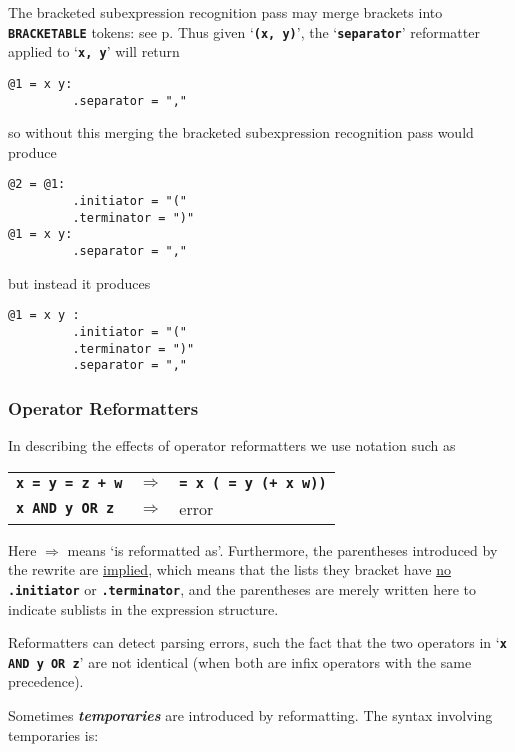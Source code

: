 \documentclass[12pt]{article}
\newcommand{\TT}[1]{{\tt \bfseries #1}}
\newcommand{\ikey}[2]{{\bf \em #1}\index{#2}}
\newcommand{\pagref}[1]{p\pageref{#1}}
\newenvironment{indpar}[1][0.3in]%
	{\begin{list}{}%
		     {\setlength{\itemsep}{0in}%
		      \setlength{\topsep}{0in}%
		      \setlength{\parsep}{1ex}%
		      \setlength{\labelwidth}{#1}%
		      \setlength{\leftmargin}{#1}%
		      \addtolength{\leftmargin}{\labelsep}}%
	 \item}%
	{\end{list}}
\begin{document}
The bracketed subexpression recognition pass may merge brackets
into \TT{BRACKETABLE} tokens: see \pagref{MERGING-BRACKETABLE-TOKENS}.
Thus given `\TT{(x, y)}', the `\TT{separator}' reformatter
applied to `\TT{x, y}' will return
\begin{indpar}\begin{verbatim}
@1 = x y:
         .separator = ","
\end{verbatim}\end{indpar}
so without this merging the bracketed subexpression recognition
pass would produce
\begin{indpar}\begin{verbatim}
@2 = @1:
         .initiator = "("
         .terminator = ")"
@1 = x y:
         .separator = ","
\end{verbatim}\end{indpar}
but instead it produces
\begin{indpar}\begin{verbatim}
@1 = x y :
         .initiator = "("
         .terminator = ")"
         .separator = ","
\end{verbatim}\end{indpar}

\subsubsection{Operator Reformatters}
\label{OPERATOR-REFORMATTERS}

In describing the effects of operator reformatters
we use notation such as

\hspace*{2em}\begin{tabular}{lcl}
\TT{x = y = z + w} & $\Longrightarrow$ & \TT{= x ( = y (+ x w))} \\
\TT{x AND y OR z} & $\Longrightarrow$ & error
\end{tabular}

Here $\Longrightarrow$ means `is reformatted as'.  Furthermore, the
parentheses introduced by the rewrite are \underline{implied},
which means that the lists they bracket have \underline{no}
\TT{.initiator} or \TT{.terminator}, and the parentheses are
merely written here to indicate sublists in the expression structure.

Reformatters can detect parsing errors, such the fact that the two
operators in `\TT{x AND y OR z}' are not identical (when both are
infix operators with the same precedence).

Sometimes \ikey{temporaries}{temporary}\label{TEMPORARY}
are introduced by reformatting.  The syntax involving temporaries is:
\end{document}
